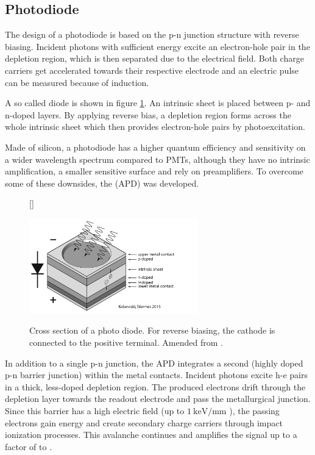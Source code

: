 \subsection{Photodiode}

The design of a photodiode is based on the p-n junction structure with reverse biasing. Incident photons with sufficient energy excite an electron-hole pair in the depletion region, which is then separated due to the electrical field. Both charge carriers get accelerated towards their respective electrode and an electric pulse can be measured because of induction. \par 
A so called  diode is shown in figure \ref{fig:ch3:diode}. An intrinsic sheet is placed between p- and n-doped layers. By applying reverse bias, a depletion region forms across the whole intrinsic sheet which then provides electron-hole pairs by photoexcitation. \par 
Made of silicon, a photodiode has a higher quantum efficiency and sensitivity on a wider wavelength spectrum compared to PMTs, although they have no intrinsic amplification, a smaller sensitive surface and rely on preamplifiers. To overcome some of these downsides, the  (APD) was developed. \par
\begin{figure}[b]
	[\FBwidth]
	{\caption[Photodiode]{Cross section of a photo diode. For reverse biasing, the cathode is connected to the positive terminal. Amended from \cite{wermes}.}   
		\label{fig:ch3:diode}}
	{\includegraphics[width=0.65\textwidth]{./graphics/ch3/diode.png}}
\end{figure}
In addition to a single p-n junction, the APD integrates a second  (highly doped p-n barrier junction) within the metal contacts. Incident photons excite h-e pairs in a thick, less-doped depletion region. The produced electrons drift through the depletion layer towards the readout electrode and pass the metallurgical junction. Since this barrier has a high electric field (up to $\SI{1}{\keV/\milli\meter}$ \cite{wermes}), the passing electrons gain energy and create secondary charge carriers through impact ionization processes. This avalanche continues and amplifies the signal up to a factor of  to . \par 
